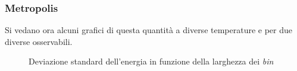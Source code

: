 \subsubsection*{Metropolis}
Si vedano ora alcuni grafici di questa quantità a diverse temperature e per due diverse osservabili.
\begin{figure}[h!]
\caption{Deviazione standard dell'energia in funzione della larghezza dei \emph{bin} }
\end{figure}
